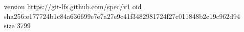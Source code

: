 version https://git-lfs.github.com/spec/v1
oid sha256:e177724b1c84a636699e7e7a27e9c41f3482981724f27c011848b2c19c962d94
size 3799
